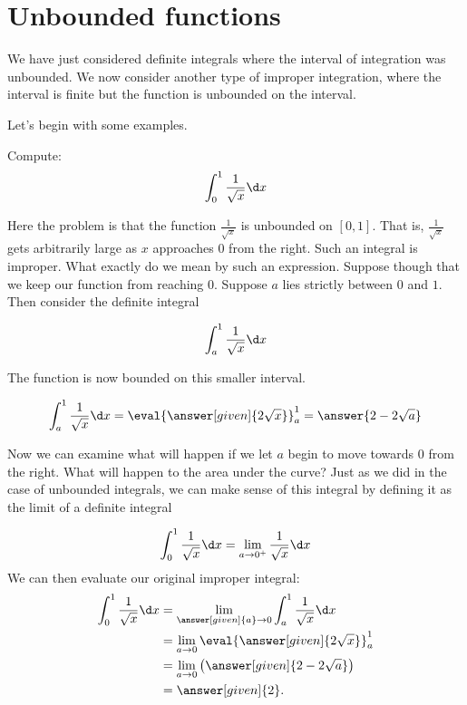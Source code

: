 \documentclass{ximera}
\begin{document}
\section{Unbounded functions}

We have just considered definite integrals where the interval of
integration was unbounded. We now consider another type of improper
integration, where the interval is finite but the function is unbounded on the interval. 




Let's begin with some examples.

\begin{example}	
  Compute:
  \[
  \int_{0}^1 \frac{1}{\sqrt{x}} \d x
  \]
  \begin{explanation}
Here the problem is that the function $\frac{1}{\sqrt{x}}$ is unbounded on $[0,1]$. That is, $\frac{1}{\sqrt{x}}$ gets arbitrarily large as $x$ 
approaches $0$ from the right. Such an integral is improper. What exactly do we mean by such an expression. Suppose though that we keep our function from reaching $0$. Suppose $a$ lies strictly between $0$ and $1$. Then consider the definite integral

\[
\int_{a}^{1} \frac{1}{\sqrt{x}} \d x
\]

The function is now bounded on this smaller interval. 

\[
\int_{a}^1 \frac{1}{\sqrt{x}} \d x=  \eval{\answer[given]{2\sqrt{x}}}_a^1=\answer{2-2\sqrt{a}}
\]

Now we can examine what will happen if we let $a$ begin to move towards $0$ from the right. What will happen to the area
under the curve? 
Just as we did in the case of unbounded integrals, we can make sense of this integral by defining it as the limit
of a definite integral 

\[
\int_{0}^{1} \frac{1}{\sqrt{x}} \d x=\lim_{a \to 0^{+}} \frac{1}{\sqrt{x}} \d x
\]
We can then evaluate our original improper integral: 
    \begin{align*}
      \int_{0}^1 \frac{1}{\sqrt{x}} \d x &= \lim_{\answer[given]{a} \to 0} \int_{a}^1 \frac{1}{\sqrt{x}} \d x \\
      &=  \lim_{a \to 0}  \eval{\answer[given]{2\sqrt{x}}}_a^1 \\
      &=  \lim_{a \to 0} \left(\answer[given]{2-2\sqrt{a}}\right)\\
      &= \answer[given]{2}.
    \end{align*}


\end{explanation}
\end{example}
\end{document}
